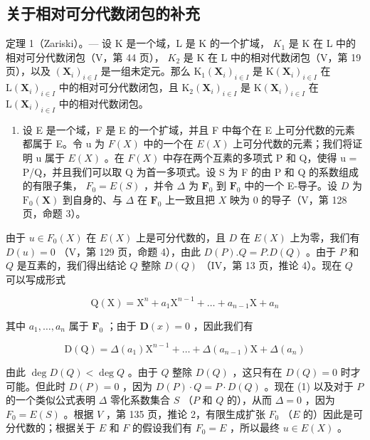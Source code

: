 \subsection{关于相对可分代数闭包的补充}

定理 1（Zariski）。--- 设 K 是一个域，L 是 K 的一个扩域， \(K_{1}\) 是 K 在 L 中的相对可分代数闭包（V，第 44 页）， \(K_{2}\) 是 K 在 L 中的相对代数闭包（V，第 19 页），以及 \((\mathbf{X}_{i})_{i\in I}\) 是一组未定元。那么 \(\mathrm{K}_{1}(\mathbf{X}_{i})_{i\in I}\) 是 \(\mathrm{K}(\mathbf{X}_{i})_{i\in I}\) 在 \(\mathrm{L}(\mathbf{X}_{i})_{i\in I}\) 中的相对可分代数闭包，且 \(\mathrm{K}_{2}(\mathbf{X}_{i})_{i\in I}\) 是 \(\mathrm{K}(\mathbf{X}_{i})_{i\in I}\) 在 \(\mathrm{L}(\mathbf{X}_{i})_{i\in I}\) 中的相对代数闭包。

\begin{enumerate}
\def\labelenumi{\Alph{enumi})}
\tightlist
\item
  设 E 是一个域，F 是 E 的一个扩域，并且 F 中每个在 E 上可分代数的元素都属于 E。令 u 为 \(F(X)\) 中的一个在 \(E(X)\) 上可分代数的元素；我们将证明 u 属于 \(E(X)\) 。在 \(F(X)\) 中存在两个互素的多项式 P 和 Q，使得 u = P/Q，并且我们可以取 Q 为首一多项式。设 S 为 F 的由 P 和 Q 的系数组成的有限子集， \(F_{0} = E(S)\) ，并令 \(\Delta\) 为 \(\mathbf{F}_0\) 到 \(\mathbf{F}_0\) 中的一个 E-导子。设 \(D\) 为 \(\mathrm{F}_0(\mathbf{X})\) 到自身的、与 \(\Delta\) 在 \(\mathbf{F}_0\) 上一致且把 \(X\) 映为 0 的导子（V，第 128 页，命题 3）。
\end{enumerate}

由于 \(u \in F_0(X)\) 在 \(E(X)\) 上是可分代数的，且 \(D\) 在 \(E(X)\) 上为零，我们有 \(D(u) = 0\) （V，第 129 页，命题 4），由此 \(D(P).Q = P.D(Q)\) 。由于 \(P\) 和 \(Q\) 是互素的，我们得出结论 \(Q\) 整除 \(D(Q)\) （IV，第 13 页，推论 4）。现在 \(Q\) 可以写成形式

\[
\mathrm{Q} (\mathrm{X}) = \mathrm{X} ^ {n} + a _ {1} \mathrm{X} ^ {n - 1} + \dots + a _ {n - 1} \mathrm{X} + a _ {n}
\]

其中 \(a_1, \ldots, a_n\) 属于 \(\mathbf{F}_0\) ；由于 \(\mathbf{D}(x) = 0\) ，因此我们有

\[
\mathrm{D} (\mathrm{Q}) = \Delta (a _ {1}) \mathrm{X} ^ {n - 1} + \dots + \Delta (a _ {n - 1}) \mathrm{X} + \Delta (a _ {n})\tag{1}
\]

由此 \(\deg D(Q) < \deg Q\) 。由于 \(Q\) 整除 \(D(Q)\) ，这只有在 \(D(Q) = 0\) 时才可能。但此时 \(D(P) = 0\) ，因为 \(D(P) \cdot Q = P \cdot D(Q)\) 。现在 (1) 以及对于 \(P\) 的一个类似公式表明 \(\Delta\) 零化系数集合 \(S\) （\(P\) 和 \(Q\) 的），从而 \(\Delta = 0\) ，因为 \(F_0 = E(S)\) 。根据 \(V\) ，第 135 页，推论 2，有限生成扩张 \(F_0\) （\(E\) 的）因此是可分代数的；根据关于 \(E\) 和 \(F\) 的假设我们有 \(F_0 = E\) ，所以最终 \(u \in E(X)\) 。


